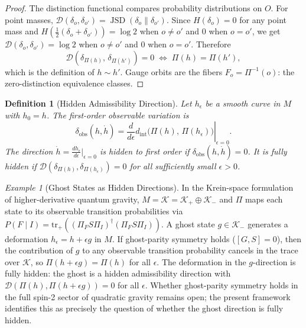 \documentclass[12pt,a4paper]{article}
\newtheorem{definition}[theorem]{Definition}
\theoremstyle{remark}
\newtheorem{example}{Example}[section]
\theoremstyle{definition}
\begin{document}
\begin{proof}
The distinction functional compares probability distributions on $O$. For
point masses, $\mathcal{D}(\delta_o, \delta_{o'}) = \operatorname{JSD}(\delta_o
\| \delta_{o'})$. Since $H(\delta_o) = 0$ for any point mass and
$H(\frac{1}{2}(\delta_o + \delta_{o'})) = \log 2$ when $o \neq o'$ and $0$
when $o = o'$, we get $\mathcal{D}(\delta_o, \delta_{o'}) = \log 2$ when
$o \neq o'$ and $0$ when $o = o'$. Therefore
\[\mathcal{D}(\delta_{\Pi(h)},\, \delta_{\Pi(h')}) = 0
  \;\iff\; \Pi(h) = \Pi(h'),\]
which is the definition of $h \sim h'$. Gauge orbits are the fibers
$F_o = \Pi^{-1}(o)$: the zero-distinction equivalence classes.
\end{proof}

\begin{definition}[Hidden Admissibility Direction]
\label{def:hidden}
Let $h_\epsilon$ be a smooth curve in $M$ with $h_0 = h$. The
\emph{first-order observable variation} is
\begin{equation}
  \delta_{\mathrm{obs}}(h, \dot h)
  = \left.\frac{d}{d\epsilon}
    d_{\mathrm{int}}\!\bigl(\Pi(h),\, \Pi(h_\epsilon)\bigr)
    \right|_{\epsilon=0}.
\end{equation}
The direction $\dot h = \frac{dh_\epsilon}{d\epsilon}|_{\epsilon=0}$
is \emph{hidden to first order} if $\delta_{\mathrm{obs}}(h, \dot h) = 0$.
It is \emph{fully hidden} if $\mathcal{D}(\delta_{\Pi(h)}, \delta_{\Pi(h_\epsilon)}) = 0$
for all sufficiently small $\epsilon > 0$.
\end{definition}

\begin{example}[Ghost States as Hidden Directions]
\label{ex:ghosts}
In the Krein-space formulation of higher-derivative quantum gravity,
$M = \mathcal{K} = \mathcal{K}_+ \oplus \mathcal{K}_-$ and $\Pi$ maps
each state to its observable transition probabilities via
$P(F \mid I) = \mathrm{tr}_+((\Pi_F S \Pi_I)^\dagger(\Pi_F S \Pi_I))$.
A ghost state $g \in \mathcal{K}_-$ generates a deformation $h_\epsilon = h
+ \epsilon g$ in $M$. If ghost-parity symmetry holds ($[G, S] = 0$), then
the contribution of $g$ to any observable transition probability cancels
in the trace over $\mathcal{K}$, so $\Pi(h + \epsilon g) = \Pi(h)$ for
all $\epsilon$. The deformation in the $g$-direction is fully hidden: the
ghost is a hidden admissibility direction with $\mathcal{D}(\Pi(h),
\Pi(h + \epsilon g)) = 0$ for all $\epsilon$. Whether ghost-parity symmetry
holds in the full spin-2 sector of quadratic gravity remains open; the
present framework identifies this as precisely the question of whether the
ghost direction is fully hidden.
\end{example}
\end{document}

